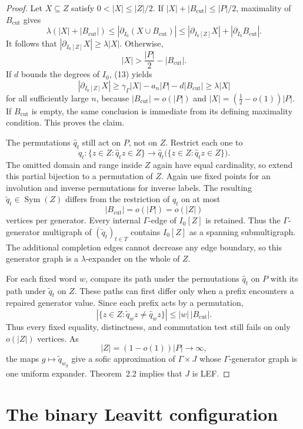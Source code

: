 \documentclass[10pt]{article}
\newcommand{\Sym}{\operatorname{Sym}}
\newcommand{\abs}[1]{\left|#1\right|}
\begin{document}
\begin{proof}
Let $X\subseteq Z$ satisfy $0<\abs{X}\leq\abs{Z}/2$. If $\abs{X}+\abs{B_{\mathrm{cut}}}\leq\abs{P}/2$, maximality of $B_{\mathrm{cut}}$ gives
\[
\lambda(\abs{X}+\abs{B_{\mathrm{cut}}})
\leq\abs{\partial_{I_0}(X\cup B_{\mathrm{cut}})}
\leq\abs{\partial_{I_0[Z]}X}+\abs{\partial_{I_0}B_{\mathrm{cut}}}.
\]
It follows that $\abs{\partial_{I_0[Z]}X}\geq\lambda\abs{X}$. Otherwise,
\[
\abs{X}>\frac{\abs{P}}2-\abs{B_{\mathrm{cut}}}.
\]
If $d$ bounds the degrees of $I_0$, (13) yields
\[
\abs{\partial_{I_0[Z]}X}\geq\gamma_\Gamma\abs{X}-a_n\abs{P}-d\abs{B_{\mathrm{cut}}}\geq\lambda\abs{X}
\]
for all sufficiently large $n$, because $\abs{B_{\mathrm{cut}}}=o(\abs{P})$ and $\abs{X}=(\tfrac12-o(1))\abs{P}$. If $B_{\mathrm{cut}}$ is empty, the same conclusion is immediate from its defining maximality condition. This proves the claim.

The permutations $\widehat q_t$ still act on $P$, not on $Z$. Restrict each one to
\[
\widehat q_t:\{z\in Z:\widehat q_tz\in Z\}\longrightarrow
\widehat q_t\bigl(\{z\in Z:\widehat q_tz\in Z\}\bigr).
\]
The omitted domain and range inside $Z$ again have equal cardinality, so extend this partial bijection to a permutation of $Z$. Again use fixed points for an involution and inverse permutations for inverse labels. The resulting $\widetilde q_t\in\Sym(Z)$ differs from the restriction of $\widehat q_t$ on at most
\[
\abs{B_{\mathrm{cut}}}=o(\abs{P})=o(\abs{Z})
\]
vertices per generator. Every internal $\Gamma$-edge of $I_0[Z]$ is retained. Thus the $\Gamma$-generator multigraph of $(\widetilde q_t)_{t\in T}$ contains $I_0[Z]$ as a spanning submultigraph. The additional completion edges cannot decrease any edge boundary, so this generator graph is a $\lambda$-expander on the whole of $Z$.

For each fixed word $w$, compare its path under the permutations $\widehat q_t$ on $P$ with its path under $\widetilde q_t$ on $Z$. These paths can first differ only when a prefix encounters a repaired generator value. Since each prefix acts by a permutation,
\[
\abs{\{z\in Z:\widetilde q_wz\neq\widehat q_wz\}}\leq\abs{w}\,\abs{B_{\mathrm{cut}}}.
\]
Thus every fixed equality, distinctness, and commutation test still fails on only $o(\abs{Z})$ vertices. As
\[
\abs{Z}=(1-o(1))\abs{P}\longrightarrow\infty,
\]
the maps $g\mapsto\widetilde q_{w_g}$ give a sofic approximation of $\Gamma\times J$ whose $\Gamma$-generator graph is one uniform expander. Theorem~2.2 implies that $J$ is LEF.
\end{proof}

\section{The binary Leavitt configuration}
\end{document}
